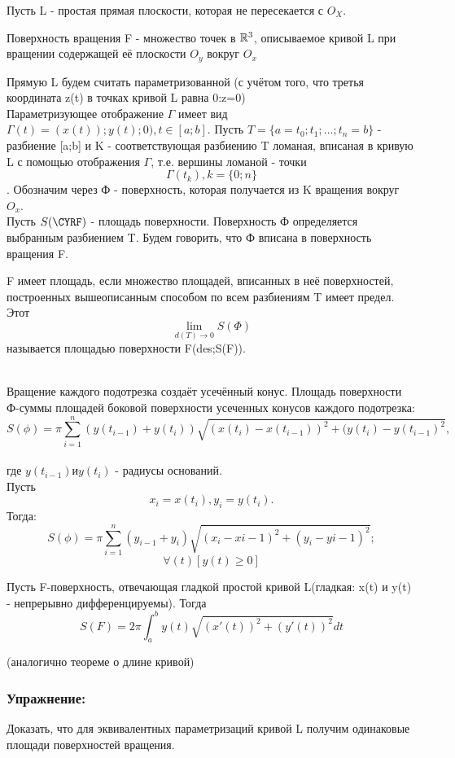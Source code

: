 Пусть L - простая прямая плоскости, которая не пересекается с $O_X$.

\begin{opred}
	Поверхность вращения F - множество точек в $\mathbb{R}^3$, описываемое кривой L при вращении содержащей её плоскости $O_y$ вокруг $O_x$
\end{opred}
Прямую L будем считать параметризованной (с учётом того, что третья координата z(t) в точках кривой L равна 0:z=0)
\\
Параметризующее отображение $\varGamma$ имеет вид $\varGamma(t)=(x(t)); y(t);0), t \in [a;b]$.
Пусть $T=\{a=t_0;t_1;...;t_n=b\}$ - разбиение [a;b] и K - соответствующая разбиению T ломаная, вписаная в кривую L с помощью отображения $\varGamma$, т.е. вершины ломаной - точки $$\varGamma(t_k), k=\{0;n\}$$.
Обозначим через Ф - поверхность, которая получается из K вращения вокруг $O_x$.
\\
Пусть $S(\CYRF)$ - площадь поверхности.
Поверхность Ф определяется выбранным разбиением T. Будем говорить, что Ф вписана в поверхность вращения F.
\begin{opred}
F имеет площадь, если множество площадей, вписанных в неё поверхностей, построенных вышеописанным способом по всем разбиениям T имеет предел. Этот 
$$
\lim_{d(T)\to 0}S(\Phi)
$$
называется площадью поверхности F(des;S(F)).
\end{opred}
\\
Вращение каждого подотрезка создаёт усечённый конус. Площадь поверхности Ф-суммы площадей боковой поверхности усеченных конусов каждого подотрезка:
\\
$$S(\phi)=\pi\sum_{i=1}^{n}(y(t_{i-1})+y(t_i))\sqrt{(x(t_i)-x(t_{i-1}))^2+(y(t_i)-y(t_{i-1})^2},$$ 
\\
где $ y(t_{i-1}) и y(t_i)$ - радиусы оснований.
\\
Пусть $$x_i=x(t_i), y_i=y(t_i).$$ Тогда:
\\
 $$S(\phi)=\pi\sum_{i=1}^{n}(y_{i-1}+y_i)\sqrt{(x_i-x{i-1})^2+(y_i-y{i-1})^2};$$
$$\forall(t)[y(t)\geqslant0]$$

\begin{teorema}
Пусть F-поверхность, отвечающая гладкой простой кривой L(гладкая: x(t) и y(t) - непрерывно дифференцируемы). Тогда
$$
S(F)=2\pi\int_{a}^{b}y(t)\sqrt{(x'(t))^2+(y'(t))^2}dt
$$
\end{teorema}
\dokvo
(аналогично теореме о длине кривой)

\subsubsection{Упражнение:}
Доказать, что для эквивалентных параметризаций кривой L получим одинаковые площади поверхностей вращения.

